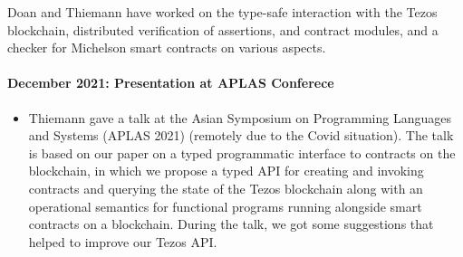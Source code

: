 \documentclass[a4paper,11pt]{article}
\begin{document}
 
Doan and Thiemann have worked on the type-safe interaction with the Tezos blockchain, distributed verification of assertions, and contract modules, and a checker for Michelson smart contracts on various aspects.
\paragraph{December 2021: Presentation at APLAS Conferece} 

\begin{itemize}
\item Thiemann gave a talk at the Asian Symposium on Programming Languages and Systems (APLAS 2021) (remotely due to the Covid situation). The talk is based on our paper on a typed programmatic interface to contracts on the blockchain, in which we propose a typed API for creating and invoking contracts and querying the state of the Tezos blockchain along with an operational semantics for functional programs running alongside smart contracts on a blockchain. During the talk, we got some suggestions that helped to improve our Tezos API.

\end{itemize}

 
\end{document}
